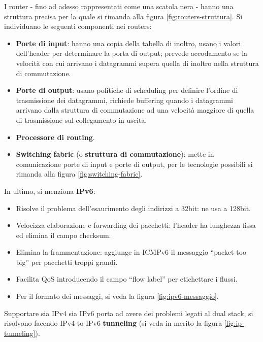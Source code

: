 \documentclass[11pt, italian, openany]{book}
\begin{document}
\begin{sloppypar}
{} \label{Routers}
I router - fino ad adesso rappresentati come una scatola nera - hanno una struttura precisa per la quale si rimanda alla figura \ref{fig:routers-struttura}. Si
individuano le seguenti componenti nei routers:
\begin{itemize}[itemsep=0pt,topsep=0pt,parsep=0pt]
	\item \textbf{Porte di input}: hanno una copia della tabella di inoltro, usano i valori dell’header per determinare la porta di output; prevede accodamento
	se la velocit\`a con cui arrivano i datagrammi supera quella di inoltro nella struttura di commutazione.
	\item \textbf{Porte di output}: usano politiche di scheduling per definire l'ordine di trasmissione dei datagrammi, richiede buffering quando i datagrammi
	arrivano dalla struttura di commutazione ad una velocit\`a maggiore di quella di trasmissione sul collegamento in uscita.
	\item \textbf{Processore di routing}.
	\item \textbf{Switching fabric} (o \textbf{struttura di commutazione}): mette in comunicazione porte di input e porte di output, per le tecnologie possibili
	si rimanda alla figura \ref{fig:switching-fabric}.
\end{itemize}

In ultimo, si menziona \textbf{IPv6}:
\begin{itemize}[itemsep=0pt,topsep=0pt,parsep=0pt]
	\item Risolve il problema dell'esaurimento degli indirizzi a 32bit: ne usa a 128bit.
	\item Velocizza elaborazione e forwarding dei pacchetti: l'header ha lunghezza fissa ed elimina il campo checksum.
	\item Elimina la frammentazione: aggiunge in ICMPv6 il messaggio ``packet too big'' per pacchetti troppi grandi.
	\item Facilita QoS introducendo il campo ``flow label'' per etichettare i flussi.
	\item Per il formato dei messaggi, si veda la figura \ref{fig:ipv6-messaggio}.
\end{itemize}
Supportare sia IPv4 sia IPv6 porta ad avere dei problemi legati al dual stack, si risolvono facendo IPv4-to-IPv6 \textbf{tunneling} (si veda in merito
la figura \ref{fig:ip-tunneling}).


\end{sloppypar}
\end{document}
